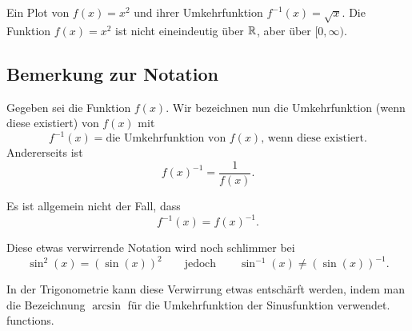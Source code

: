\begin{marginfigure}[0in]
\caption{Ein Plot von $f(x)=x^2$ und ihrer Umkehrfunktion $f^{-1}(x) = \sqrt{x}$. Die Funktion
  $f(x)=x^2$ ist nicht eineindeutig über $\mathbb{R}$, aber über $[0,\infty)$.}
\label{plot:fxn and inverse x^2}
\end{marginfigure}


\subsection{Bemerkung zur Notation}

Gegeben sei die Funktion $f(x)$. Wir bezeichnen nun die Umkehrfunktion (wenn diese existiert) von $f(x)$ mit
\[
f^{-1}(x) = \text{die Umkehrfunktion von $f(x)$, wenn diese existiert.}
\]
Andererseits ist
\[
f(x)^{-1} = \frac{1}{f(x)}.
\]

\begin{warning}
Es ist allgemein nicht der Fall, dass
\[
f^{-1}(x) = f(x)^{-1}.
\]
\end{warning}

Diese etwas verwirrende Notation wird noch schlimmer bei
\[
\sin^2(x) = (\sin(x))^2\qquad \text{jedoch} \qquad \sin^{-1}(x)
\ne(\sin(x))^{-1}.
\]

In der Trigonometrie kann diese Verwirrung etwas entschärft werden, indem man die Bezeichnung $\arcsin$ für die Umkehrfunktion der Sinusfunktion verwendet.
functions.




